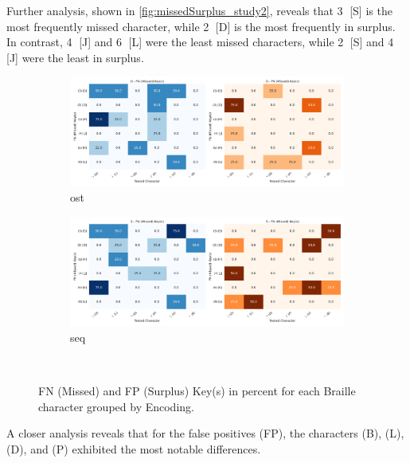 Further analysis, shown in \autoref{fig:missedSurplus_study2}, reveals that \textcircled{3} [S] is the most frequently missed character, while \textcircled{2} [D] is the most frequently in surplus. In contrast, \textcircled{4} [J] and \textcircled{6} [L] were the least missed characters, while \textcircled{2} [S] and \textcircled{4} [J] were the least in surplus.


\begin{figure}[h!]
    \centering
    \begin{subfigure}[b]{0.45\textwidth}
        \centering
        \includegraphics[width=\textwidth]{src/pictures/Study2Data_Experiment/Eval/heatmap_O_correlations_by_conditions_counts.pdf}
        \caption{\gls{ost}}
    \end{subfigure}
    \begin{subfigure}[b]{0.45\textwidth}
        \centering
        \includegraphics[width=\textwidth]{src/pictures/Study2Data_Experiment/Eval/heatmap_S_correlations_by_conditions_counts.pdf}
        \caption{\gls{seq}}
    \end{subfigure}\\
    \caption{FN (Missed) and FP (Surplus) Key(s) in percent for each Braille character grouped by Encoding.}
    \label{fig:missed_surplus_percentages_study2}
\end{figure}

A closer analysis reveals that for the false positives (FP), the characters (B), (L), (D), and (P) exhibited the most notable differences.

